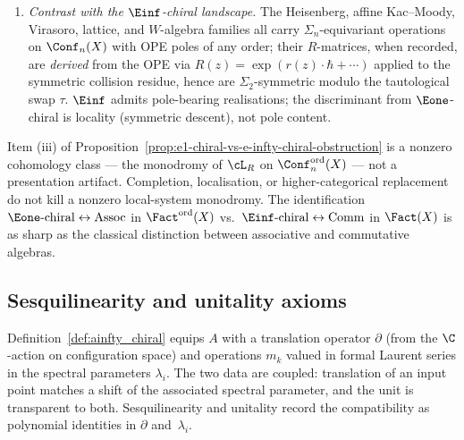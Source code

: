 \begin{proposition}
\begin{enumerate}[label=\textup{(\roman*)}]
\textup{(}Francis--Gaitsgory \cite{FG12}, IV.5, in the ordered
variant\textup{)}. The analogous functor to $\Fact(X)$ with
values in $\Einf$-chiral factorization algebras does \emph{not}
exist: the obstruction (iii) is detected by the non-vanishing of the
elementary-transposition monodromy of the local system $\cL_R$ of
Theorem~A$^{\infty,2}$, and equivalently by the fact that the
$R$-twisted $\Sigma_n$-descent of the ordered bar
$B^{\mathrm{ord}}(\Yhbar)$ does not degenerate to ordinary
$\Sigma_n$-coinvariants.
\item \emph{Contrast with the $\Einf$-chiral landscape.} The
Heisenberg, affine Kac--Moody, Virasoro, lattice, and $W$-algebra
families all carry $\Sigma_n$-equivariant operations on
$\Conf_n(X)$ with OPE poles of any order; their $R$-matrices, when
recorded, are \emph{derived} from the OPE via
$R(z) = \exp(r(z) \cdot \hbar + \cdots)$ applied to the symmetric
collision residue, hence are $\Sigma_2$-symmetric modulo the
tautological swap $\tau$. $\Einf$ admits pole-bearing realisations;
the discriminant from $\Eone$-chiral is locality (symmetric descent),
not pole content.
\end{enumerate}
\end{proposition}

\begin{remark}
\label{rem:e1-einf-chiral-sharp}
Item (iii) of Proposition~\ref{prop:e1-chiral-vs-e-infty-chiral-obstruction}
is a nonzero cohomology class — the monodromy of $\cL_R$ on
$\Conf_n^{\mathrm{ord}}(X)$ — not a presentation artifact. Completion,
localisation, or higher-categorical replacement do not kill a nonzero
local-system
monodromy. The identification
$\Eone\text{-chiral} \leftrightarrow \mathrm{Assoc}$ in
$\Fact^{\mathrm{ord}}(X)$ vs.\
$\Einf\text{-chiral} \leftrightarrow \mathrm{Comm}$ in $\Fact(X)$
is as sharp as the classical distinction between associative and
commutative algebras.
\end{remark}

\subsection{Sesquilinearity and unitality axioms}
\label{subsec:sesqui}

Definition~\ref{def:ainfty_chiral} equips $A$ with a translation operator $\partial$ (from the $\C$-action on configuration space) and operations $m_k$ valued in formal Laurent series in the spectral parameters $\lambda_i$. The two data are coupled: translation of an input point matches a shift of the associated spectral parameter, and the unit is transparent to both. Sesquilinearity and unitality record the compatibility as polynomial identities in $\partial$ and~$\lambda_i$.

